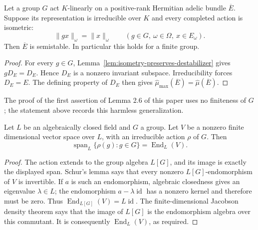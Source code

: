 \begin{lemma}
\label{lem:group-semistability}
\leanok
Let a group $G$ act $K$-linearly on a positive-rank Hermitian adelic
bundle $\overline E$. Suppose its representation is irreducible over $K$
and every completed action is isometric:
\[
 \|g x\|_\omega=\|x\|_\omega
 \qquad(g\in G,\ \omega\in\Omega,\ x\in E_\omega).
\]
Then $\overline E$ is semistable. In particular this holds for a finite group.
\end{lemma}
\begin{proof}
For every $g\in G$, Lemma~\ref{lem:isometry-preserves-destabilizer}
gives $gD_E=D_E$. Hence $D_E$ is a nonzero invariant subspace.
Irreducibility forces $D_E=E$. The defining property of $D_E$ then gives
$\widehat\mu_{\max}(\overline E)=\widehat\mu(\overline E)$.
\end{proof}

The proof of the first assertion of Lemma 2.6 of this paper uses no
finiteness of $G$; the statement above records this harmless generalization.

\begin{lemma}
\label{lem:irreducible-action-span}
\leanok
Let $L$ be an algebraically closed field and $G$ a group. Let $V$ be a nonzero
finite dimensional vector space over $L$, with an irreducible action $\rho$
of $G$. Then
\[
 \operatorname{span}_L\{\rho(g):g\in G\}
       =\operatorname{End}_L(V).
\]
\end{lemma}
\begin{proof}
The action extends to the group algebra $L[G]$, and its image is exactly
the displayed span. Schur's lemma says that every nonzero
$L[G]$-endomorphism of $V$ is invertible. If $a$ is such an endomorphism,
algebraic closedness gives an eigenvalue $\lambda\in L$; the endomorphism
$a-\lambda\operatorname{id}$ has a nonzero kernel and therefore must be
zero. Thus $\operatorname{End}_{L[G]}(V)=L\operatorname{id}$.
The finite-dimensional Jacobson density theorem says that the image of
$L[G]$ is the endomorphism algebra over this commutant. It is consequently
$\operatorname{End}_L(V)$, as required.
\end{proof}

